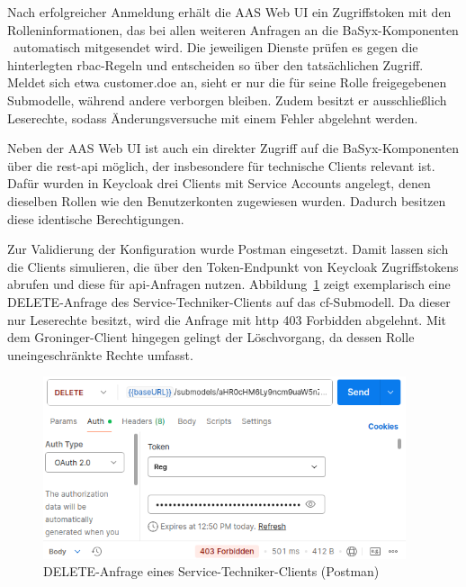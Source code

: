 \vspace{-0.35em}

Nach erfolgreicher Anmeldung erhält die AAS Web UI ein Zugriffstoken mit den Rolleninformationen, das bei allen weiteren Anfragen an die BaSyx-Komponenten%
\pagebreak
~automatisch mitgesendet wird.
Die jeweiligen Dienste prüfen es gegen die hinterlegten \acs{rbac}-Regeln und entscheiden so über den tatsächlichen Zugriff.
Meldet sich etwa customer.doe an, sieht er nur die für seine Rolle freigegebenen Submodelle, während andere verborgen bleiben.
Zudem besitzt er ausschließlich Leserechte, sodass Änderungsversuche mit einem Fehler abgelehnt werden.

Neben der AAS Web UI ist auch ein direkter Zugriff auf die BaSyx-Komponenten über die \acs{rest}-\acs{api} möglich, der insbesondere für technische Clients relevant ist. 
Dafür wurden in Keycloak drei Clients mit Service Accounts angelegt, denen dieselben Rollen wie den Benutzerkonten zugewiesen wurden. 
Dadurch besitzen diese identische Berechtigungen.

Zur Validierung der Konfiguration wurde Postman eingesetzt. 
Damit lassen sich die Clients simulieren, die über den Token-Endpunkt von Keycloak Zugriffstokens abrufen und diese für \acs{api}-Anfragen nutzen.
Abbildung~\ref{fig:DELETEServiceTechniker} zeigt exemplarisch eine DELETE-Anfrage des Service-Techniker-Clients auf das \acs{cf}-Submodell. 
Da dieser nur Leserechte besitzt, wird die Anfrage mit \acs{http} 403 Forbidden abgelehnt. 
Mit dem Groninger-Client hingegen gelingt der Löschvorgang, da dessen Rolle uneingeschränkte Rechte umfasst.

\vspace{0.25em}
\begin{figure}[htbp]
    \centering
        \includegraphics[width=0.95\textwidth]{Bilder/Ergebnisse/DPP/Postman/TechnicianDelet.png}
    \caption[DELETE-Anfrage eines Service-Techniker-Clients]{DELETE-Anfrage eines Service-Techniker-Clients (Postman)}
    \label{fig:DELETEServiceTechniker}
\end{figure}
\vspace{-0.25em}

